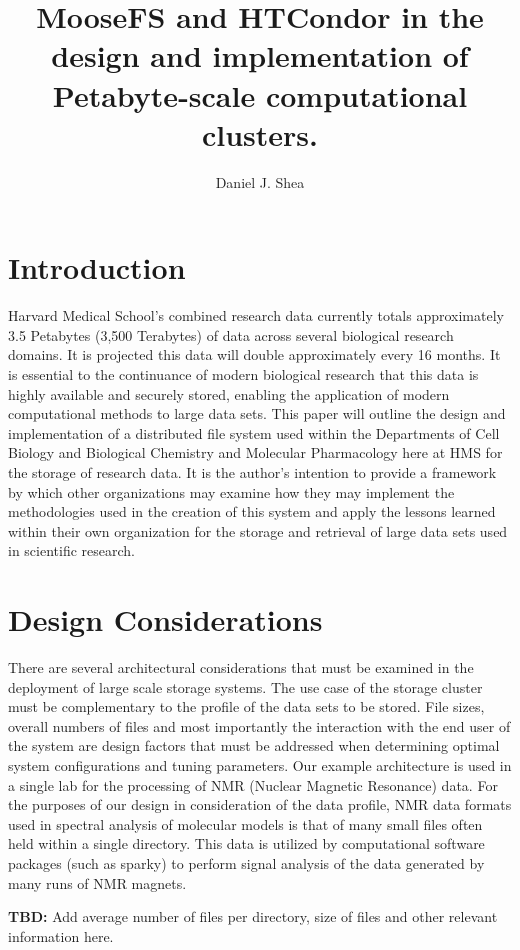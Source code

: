 \documentclass[a4paper, 10pt]{paper}
\title{MooseFS and HTCondor in the design and implementation of Petabyte-scale computational clusters.}
\author{Daniel J. Shea}
\begin{document}
\maketitle
\section{Introduction}
Harvard Medical School's combined research data currently totals approximately 3.5 Petabytes (3,500 Terabytes) of data across several biological research domains.  It is projected this data will double approximately every 16 months.  It is essential to the continuance of modern biological research that this data is highly available and securely stored, enabling the application of modern computational methods to large data sets.  This paper will outline the design and implementation of a distributed file system used within the Departments of Cell Biology and Biological Chemistry and Molecular Pharmacology here at HMS for the storage of research data.  It is the author's intention to provide a framework by which other organizations may examine how they may implement the methodologies used in the creation of this system and apply the lessons learned within their own organization for the storage and retrieval of large data sets used in scientific research.
\section{Design Considerations}
There are several architectural considerations that must be examined in the deployment of large scale storage systems.  The use case of the storage cluster must be complementary to the profile of the data sets to be stored.  File sizes, overall numbers of files and most importantly the interaction with the end user of the system are design factors that must be addressed when determining optimal system configurations and tuning parameters.  Our example architecture is used in a single lab for the processing of NMR (Nuclear Magnetic Resonance) data.  For the purposes of our design in consideration of the data profile, NMR data formats used in spectral analysis of molecular models is that of many small files often held within a single directory.  This data is utilized by computational software packages (such as sparky) to perform signal analysis of the data generated by many runs of NMR magnets.

\textbf{TBD:} Add average number of files per directory, size of files and other relevant information here.
\end{document}
